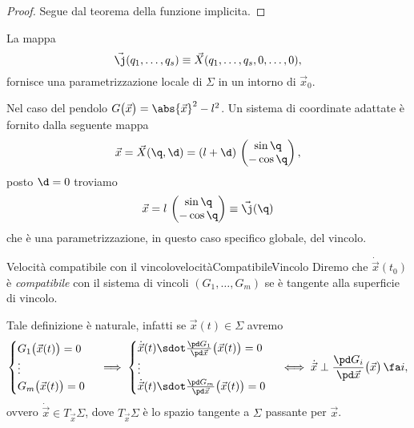 \begin{proof}
	Segue dal teorema della funzione implicita.
\end{proof}

\begin{oss}
	La mappa
	\[
		\vec{\j}(q_1,\ldots,q_s) \equiv \vec{X}(q_1,\ldots,q_s,0,\ldots,0),
	\]
	fornisce una parametrizzazione locale di \(\Sigma\) in un intorno di \(\vec{x}_0\).
\end{oss}

\begin{ese}
	Nel caso del pendolo \(G\big(\vec{x}\big)=\abs{\vec{x}}^2-l^2\).
	Un sistema di coordinate adattate è fornito dalla seguente mappa
	\[
		\vec{x} = \vec{X}(\q,\d) = (l+\d)\,\begin{pmatrix}\sin\q\\-\cos\q\end{pmatrix},
	\]
	posto \(\d=0\) troviamo
	\[
		\vec{x} = l\,\begin{pmatrix}\sin\q\\-\cos\q\end{pmatrix} \equiv \vec{\j}(\q)
	\]
	che è una parametrizzazione, in questo caso specifico globale, del vincolo.
\end{ese}

\begin{defn}{Velocità compatibile con il vincolo}{velocitàCompatibileVincolo}
	Diremo che \(\dot{\vec{x}}(t_0)\) è \emph{compatibile} con il sistema di vincoli \((G_1,\ldots,G_m)\) se è tangente alla superficie di vincolo.
\end{defn}

\begin{oss}
	Tale definizione è naturale, infatti se \(\vec{x}(t)\in\Sigma\) avremo
	\[
		\begin{cases}
			G_1\big(\vec{x}(t)\big) = 0 \\
			\vdots                      \\
			G_m\big(\vec{x}(t)\big) = 0
		\end{cases} \implies
		\begin{cases}
			\dot{\vec{x}}(t) \sdot \frac{\pd G_1}{\pd\vec{x}}\big(\vec{x}(t)\big) = 0 \\
			\vdots                                                                    \\
			\dot{\vec{x}}(t) \sdot \frac{\pd G_m}{\pd\vec{x}}\big(\vec{x}(t)\big) = 0
		\end{cases} \iff \dot{\vec{x}} \perp \frac{\pd G_i}{\pd\vec{x}}\big(\vec{x}\big)\,\fa i,
	\]
	ovvero \(\dot{\vec{x}} \in T_{\vec{x}}\Sigma\), dove \(T_{\vec{x}}\Sigma\) è lo spazio tangente a \(\Sigma\) passante per \(\vec{x}\).
\end{oss}

